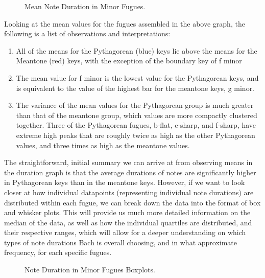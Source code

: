 \begin{figure}[H]
    \begin{center}
    \caption{Mean Note Duration in Minor Fugues.}
    \end{center}
\end{figure}
    
    Looking at the mean values for the fugues assembled in the above graph,
the following is a list of observations and interpretations:

\begin{enumerate}
\def\labelenumi{\arabic{enumi}.}
\tightlist
\item
  All of the means for the Pythagorean (blue) keys lie above the means
  for the Meantone (red) keys, with the exception of the boundary key of
  f minor
\item
  The mean value for f minor is the lowest value for the Pythagorean
  keys, and is equivalent to the value of the highest bar for the
  meantone keys, g minor.
\item
  The variance of the mean values for the Pythagorean group is much
  greater than that of the meantone group, which values are more
  compactly clustered together. Three of the Pythagorean fugues, b-flat,
  c-sharp, and f-sharp, have extreme high peaks that are roughly twice
  as high as the other Pythagorean values, and three times as high as
  the meantone values.
\end{enumerate}

The straightforward, initial summary we can arrive at from observing
means in the duration graph is that the average durations of notes are
significantly higher in Pythagorean keys than in the meantone keys.
However, if we want to look closer at how individual datapoints
(representing individual note durations) are distributed within each
fugue, we can break down the data into the format of box and whisker
plots. This will provide us much more detailed information on the median
of the data, as well as how the individual quartiles are distributed,
and their respective ranges, which will allow for a deeper understanding
on which types of note durations Bach is overall choosing, and in what
approximate frequency, for each specific fugues.



\begin{figure}[H]
    \begin{center}
    \caption{Note Duration in Minor Fugues Boxplots.}
    \end{center}
\end{figure}
    


